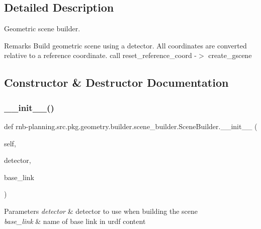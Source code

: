 \subsection{Detailed Description}
Geometric scene builder. 

\begin{DoxyRemark}{Remarks}
Build geometric scene using a detector. All coordinates are converted relative to a reference coordinate. call reset\+\_\+reference\+\_\+coord -\/$>$ create\+\_\+gscene 
\end{DoxyRemark}


\subsection{Constructor \& Destructor Documentation}
\mbox{\label{classrnb-planning_1_1src_1_1pkg_1_1geometry_1_1builder_1_1scene__builder_1_1_scene_builder_ad8161871a56a8603880ff793de656f54}} 
\subsubsection{\texorpdfstring{\+\_\+\+\_\+init\+\_\+\+\_\+()}{\_\_init\_\_()}}
{\footnotesize\ttfamily def rnb-\/planning.\+src.\+pkg.\+geometry.\+builder.\+scene\+\_\+builder.\+Scene\+Builder.\+\_\+\+\_\+init\+\_\+\+\_\+ (\begin{DoxyParamCaption}\item[{}]{self,  }\item[{}]{detector,  }\item[{}]{base\+\_\+link }\end{DoxyParamCaption})}


\begin{DoxyParams}{Parameters}
{\em detector} & detector to use when building the scene \\
\hline
{\em base\+\_\+link} & name of base link in urdf content \\
\hline
\end{DoxyParams}


